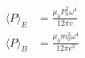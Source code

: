 

\vspace*{\fill}
\centering

\begin{align*}
    \langle P \rangle_{E} &= \frac{\mu_0 P_0^2 \omega^{4}}{12 \pi c} \\
    \langle P \rangle_{B} &= \frac{\mu_0 m_0^2 \omega^{4}}{12 \pi c^3}
\end{align*}

\centering
\vspace*{\fill}

